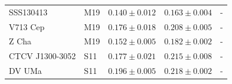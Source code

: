 \begin{table}
\begin{tabular}{llccc}
        SSS130413        & M19  &  $0.140 \pm 0.012$    & $0.163 \pm 0.004$     & -                     \\
        V713 Cep         & M19  &  $0.176 \pm 0.018$    & $0.208 \pm 0.005$     & -                     \\
        Z Cha            & M19  &  $0.152 \pm 0.005$    & $0.182 \pm 0.002$     & -                     \\
        CTCV J1300-3052  & S11  &  $0.177 \pm 0.021$    & $0.215 \pm 0.008$     & -                     \\
        DV UMa           & S11  &  $0.196 \pm 0.005$    & $0.218 \pm 0.002$     & -                     \\
        \hline
    \end{tabular}
\end{table}

